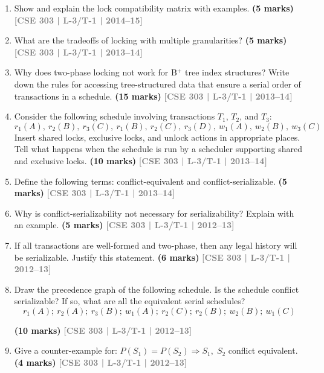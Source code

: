 \documentclass[12pt]{article}
\newcommand{\yr}[1]{\hfill\textcolor{gray}{\small\textbf{[#1]}}}
\newcommand{\mk}[1]{\textcolor{orange!70!black}{\small\textbf{(#1 marks)}}}
\begin{document}
\begin{enumerate}
\begin{center}
    \vspace{0.4cm}
    \textbf{Figure 5:} A concurrent schedule of transactions $T_1$, $T_2$ and $T_3$.
\end{center}

\mk{10} \yr{CSE 303 | L-3/T-1 | 2014--15}


\item Show and explain the lock compatibility matrix with examples.
\mk{5} \yr{CSE 303 | L-3/T-1 | 2014--15}


\item What are the tradeoffs of locking with multiple granularities?
\mk{5} \yr{CSE 303 | L-3/T-1 | 2013--14}


\item Why does two-phase locking not work for B$^+$ tree index structures? Write down the rules for accessing tree-structured data that ensure a serial order of transactions in a schedule.
\mk{15} \yr{CSE 303 | L-3/T-1 | 2013--14}


\item Consider the following schedule involving transactions $T_1$, $T_2$, and $T_3$:
\[r_1(A),\ r_2(B),\ r_3(C),\ r_1(B),\ r_2(C),\ r_3(D),\ w_1(A),\ w_2(B),\ w_3(C)\]
Insert shared locks, exclusive locks, and unlock actions in appropriate places. Tell what happens when the schedule is run by a scheduler supporting shared and exclusive locks.
\mk{10} \yr{CSE 303 | L-3/T-1 | 2013--14}


\item Define the following terms: conflict-equivalent and conflict-serializable.
\mk{5} \yr{CSE 303 | L-3/T-1 | 2013--14}


\item Why is conflict-serializability not necessary for serializability? Explain with an example.
\mk{5} \yr{CSE 303 | L-3/T-1 | 2012--13}


\item If all transactions are well-formed and two-phase, then any legal history will be serializable. Justify this statement.
\mk{6} \yr{CSE 303 | L-3/T-1 | 2012--13}



\item Draw the precedence graph of the following schedule. Is the schedule conflict serializable? If so, what are all the equivalent serial schedules?
\[r_1(A);\ r_2(A);\ r_3(B);\ w_1(A);\ r_2(C);\ r_2(B);\ w_2(B);\ w_1(C)\]

\mk{10} \yr{CSE 303 | L-3/T-1 | 2012--13}


\item Give a counter-example for: $P(S_1) = P(S_2) \Rightarrow S_1,\;S_2$ conflict equivalent.
\mk{4} \yr{CSE 303 | L-3/T-1 | 2012--13}



\end{enumerate}
\end{document}
